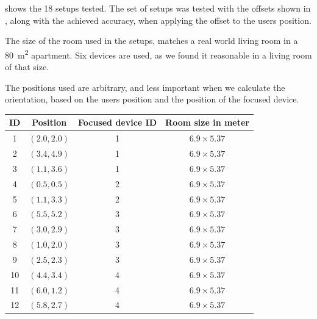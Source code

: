  shows the \num{18} setups tested. 
The set of setups was tested with the offsets shown in , 
along with the achieved accuracy, 
when applying the offset to the users position.

The size of the room used in the setups, 
matches a real world living room in a \SI{80}{\square\meter} apartment. 
Six devices are used, 
as we found it reasonable in a living room of that size.

The positions used are arbitrary, 
and less important when we calculate the orientation, 
based on the users position and the position of the focused device.

\begin{table}[!hbt]
\centering
\begin{tabular}{c|ccc}
	\textbf{ID} & \textbf{Position} & \textbf{Focused device ID} & \textbf{Room size in meter} \\ \hline
	     1      &   $(2.0 , 2.0)$   &             1              &      $6.9 \times 5.37$      \\
	     2      &   $(3.4 , 4.9)$   &             1              &      $6.9 \times 5.37$      \\
	     3      &   $(1.1 , 3.6)$   &             1              &      $6.9 \times 5.37$      \\
	     4      &   $(0.5 , 0.5)$   &             2              &      $6.9 \times 5.37$      \\
	     5      &   $(1.1 , 3.3)$   &             2              &      $6.9 \times 5.37$      \\
	     6      &   $(5.5 , 5.2)$   &             3              &      $6.9 \times 5.37$      \\
	     7      &   $(3.0 , 2.9)$   &             3              &      $6.9 \times 5.37$      \\
	     8      &   $(1.0 , 2.0)$   &             3              &      $6.9 \times 5.37$      \\
	     9      &   $(2.5 , 2.3)$   &             3              &      $6.9 \times 5.37$      \\
	    10      &   $(4.4 , 3.4)$   &             4              &      $6.9 \times 5.37$      \\
	    11      &   $(6.0 , 1.2)$   &             4              &      $6.9 \times 5.37$      \\
	    12      &   $(5.8 , 2.7)$   &             4              &      $6.9 \times 5.37$      \\

\end{tabular}
\end{table}
